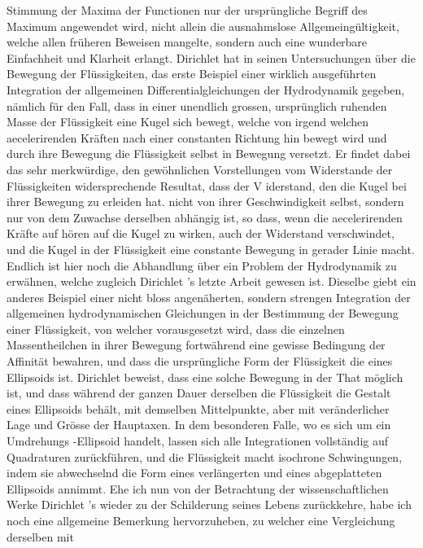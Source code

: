 \documentclass[11pt]{article}
\begin{document}
\noindent Stimmung der Maxima der Functionen nur der ursprüngliche Begriff des Maximum angewendet wird, nicht allein die ausnahmslose Allgemeingültigkeit, welche allen früheren Beweisen mangelte, sondern auch eine wunderbare Einfachheit und Klarheit erlangt. Dirichlet hat in seinen Untersuchungen über die Bewegung der Flüssigkeiten, das erste Beispiel einer wirklich ausgeführten Integration der allgemeinen Differentialgleichungen der Hydrodynamik gegeben, nämlich für den Fall, dass in einer unendlich grossen, ursprünglich ruhenden Masse der Flüssigkeit eine Kugel sich bewegt, welche von irgend welchen aecelerirenden Kräften nach einer constanten Richtung hin bewegt wird und durch ihre Bewegung die Flüssigkeit selbst in Bewegung versetzt. Er findet dabei das sehr merkwürdige, den gewöhnlichen Vorstellungen vom Widerstande der Flüssigkeiten widersprechende Resultat, dass der V iderstand, den die Kugel bei ihrer Bewegung zu erleiden hat. nicht von ihrer Geschwindigkeit selbst, sondern nur von dem Zuwachse derselben abhängig ist, so dass, wenn die aecelerirenden Kräfte auf hören auf die Kugel zu wirken, auch der Widerstand verschwindet, und die Kugel in der Flüssigkeit eine constante Bewegung in gerader Linie macht. Endlich ist hier noch die Abhandlung über ein Problem der Hydrodynamik zu erwähnen, welche zugleich Dirichlet ’s letzte Arbeit gewesen ist. Dieselbe giebt ein anderes Beispiel einer nicht bloss angenäherten, sondern strengen Integration der allgemeinen hydrodynamischen Gleichungen in der Bestimmung der Bewegung einer Flüssigkeit, von welcher vorausgesetzt wird, dass die einzelnen Massentheilchen in ihrer Bewegung fortwährend eine gewisse Bedingung der Affinität bewahren, und dass die ursprüngliche Form der Flüssigkeit die eines Ellipsoids ist. Dirichlet beweist, dass eine solche Bewegung in der That möglich ist, und dass während der ganzen Dauer derselben die Flüssigkeit die Gestalt eines Ellipsoids behält, mit demselben Mittelpunkte, aber mit veränderlicher Lage und Grösse der Hauptaxen. In dem besonderen Falle, wo es sich um ein Umdrehungs -Ellipsoid handelt, lassen sich alle Integrationen vollständig auf Quadraturen zurückführen, und die Flüssigkeit macht isochrone Schwingungen, indem sie abwechselnd die Form eines verlängerten und eines abgeplatteten Ellipsoids annimmt. Ehe ich nun von der Betrachtung der wissenschaftlichen Werke Dirichlet 's wieder zu der Schilderung seines Lebens zurückkehre, habe ich noch eine allgemeine Bemerkung hervorzuheben, zu welcher eine Vergleichung derselben mit
\par
\end{document}

